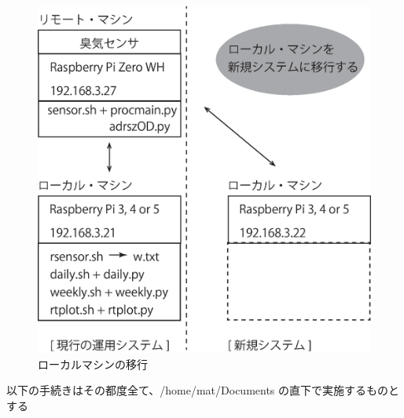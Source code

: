 \documentclass[12pt,a4paper,uplatex]{jsarticle}
\begin{document}
\begin{figure}[htbp]
	\begin{minipage}[b]{1.0\linewidth}
		\centering
		\includegraphics[keepaspectratio, scale=0.4]{figs/eps/ikou.eps}
		\caption{ローカルマシンの移行}
	\end{minipage}
\end{figure}

以下の手続きはその都度全て、/home/mat/Documents の直下で実施するものとする
\end{document}
